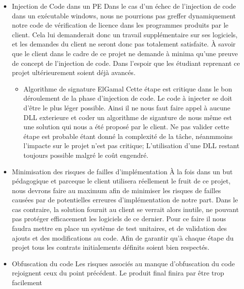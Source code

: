 \begin{itemize}
	\item Injection de Code dans un PE\newline
	Dans le cas d'un échec de l'injection de code dans un exécutable windows, nous ne pourrions pas greffer dynamiquement
	notre code de vérification de licence dans les programmes produits par le client. Cela lui demanderait donc un travail 
	supplémentaire sur ses logiciels, et les demandes du client ne seront donc pas totalement satisfaite.
	À savoir que le client dans le cadre de ce projet ne demande à minima qu'une preuve de concept de l'injection de code.
	Dans l'espoir que les étudiant reprenant ce projet ultérieurement soient déjà avancés.
		\begin{itemize}
			\item  Algorithme de signature ElGamal\newline
			Cette étape est critique dans le bon déroulement de la phase d'injection de code. Le code à injecter se doit d'être 
			le plus léger possible. Ainsi il ne nous faut faire appel à aucune DLL exterieure et coder un algorithme de siganture de nous
			même est une solution qui nous a été proposé par le client. Ne pas valider cette étape est probable étant donné
			la complexité de la tâche, néanmmoins l'impacte sur le projet n'est pas critique; L'utilisation d'une DLL restant
			toujours possible malgré le coût engendré.\newline
		\end{itemize}
	\item Minimisation des risques de failles d'implémentation\newline
	À la fois dans un but pédagogique et parceque le client utilisera réellement le fruit de ce projet, nous devrons
	faire au maximum afin de minimiser les risques de failles causées par de potentielles erreures d'implémentation de notre part.
	Dans le cas contraire, la solution fournit au client se verrait alors inutile, ne pouvant pas protéger efficacement les logiciels
	de ce dernier. 
	Pour ce faire il nous faudra mettre en place un système de test unitaires, et de validation des ajouts et des modifications au code.
	Afin de garantir qu'à chaque étape du projet tous les contrats initialements définits soient bien respectés.\newline
	\item Obfuscation du code\newline
	Les risques associés au manque d'obfuscation du code rejoignent ceux du point précédent. Le produit final finira par être trop facilement

\end{itemize}
